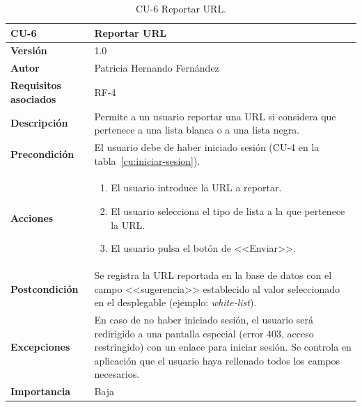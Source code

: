 \begin{table}[p]
	\centering
	\begin{tabularx}{\linewidth}{ p{} p{} }
		\toprule
		\textbf{CU-6}    & \textbf{Reportar URL}\\
		\toprule
		\textbf{Versión}              & 1.0    \\
		\textbf{Autor}                & Patricia Hernando Fernández \\
		\textbf{Requisitos asociados} & RF-4 \\
		\textbf{Descripción}          & Permite a un usuario reportar una
		URL si considera que pertenece a una lista blanca o a una lista negra.\\
		\textbf{Precondición}         & El usuario debe de haber iniciado sesión (CU-4 en la tabla~\ref{cu:iniciar-sesion}). \\
		\textbf{Acciones}             &
		\begin{enumerate}
			\def\labelenumi{\arabic{enumi}.}
			\tightlist
			\item El usuario introduce la URL a reportar.
			\item El usuario selecciona el tipo de lista a la que pertenece la URL.
			\item El usuario pulsa el botón de <<Enviar>>.
		\end{enumerate}\\
		\textbf{Postcondición}        & Se registra la URL reportada en la base de datos con el campo <<sugerencia>> establecido al valor seleccionado en el desplegable (ejemplo: \textit{white-list}). \\
		\textbf{Excepciones}          & En caso de no haber iniciado sesión, el usuario será redirigido a una pantalla especial (error 403, acceso restringido) con un enlace para iniciar sesión. Se controla en aplicación que el usuario haya rellenado todos los campos necesarios. \\
		\textbf{Importancia}          & Baja \\
		\bottomrule
	\end{tabularx}
	\caption{CU-6 Reportar URL.}
	\label{cu:reportar-url}
\end{table}


